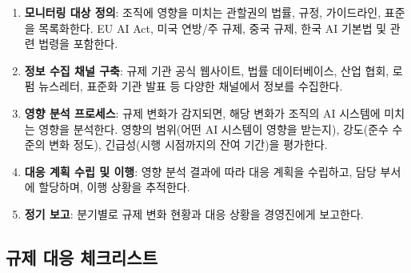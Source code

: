 \begin{enumerate}
 \item \textbf{모니터링 대상 정의}: 조직에 영향을 미치는 관할권의 법률, 규정, 가이드라인, 표준을 목록화한다. EU AI Act, 미국 연방/주 규제, 중국 규제, 한국 AI 기본법 및 관련 법령을 포함한다.

 \item \textbf{정보 수집 채널 구축}: 규제 기관 공식 웹사이트, 법률 데이터베이스, 산업 협회, 로펌 뉴스레터, 표준화 기관 발표 등 다양한 채널에서 정보를 수집한다.

 \item \textbf{영향 분석 프로세스}: 규제 변화가 감지되면, 해당 변화가 조직의 AI 시스템에 미치는 영향을 분석한다. 영향의 범위(어떤 AI 시스템이 영향을 받는지), 강도(준수 수준의 변화 정도), 긴급성(시행 시점까지의 잔여 기간)을 평가한다.

 \item \textbf{대응 계획 수립 및 이행}: 영향 분석 결과에 따라 대응 계획을 수립하고, 담당 부서에 할당하며, 이행 상황을 추적한다.

 \item \textbf{정기 보고}: 분기별로 규제 변화 현황과 대응 상황을 경영진에게 보고한다.
\end{enumerate}

\subsection{규제 대응 체크리스트}

